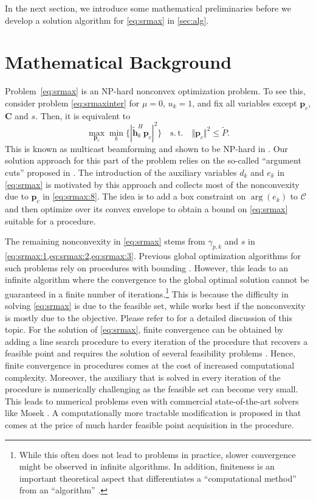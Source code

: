 \documentclass[a4paper,10pt,journal]{IEEEtran}
\newcommand{\st}{\mathrm{s.\,t.}}
\let\vec\bm
\begin{document}
In the next section, we introduce some mathematical preliminaries before we develop a solution algorithm for \cref{eq:srmax} in \cref{sec:alg}.

\section{Mathematical Background} \label{sec:sitfund}
Problem~\cref{eq:srmax} is an NP-hard nonconvex optimization problem. To see this, consider problem \cref{eq:srmaxinter} for $\mu = 0$, $u_k = 1$, and fix all variables except $\vec p_c$, $\vec C$ and $s$. Then, it is equivalent to
\begin{equation}
	\max_{\vec p_c} \min_k \{ | \tilde{\vec h}_k^H \vec p_c |^2 \} \quad\st\quad \Vert \vec p_c \Vert^2 \le \tilde P.
\end{equation}
This is known as multicast beamforming and shown to be NP-hard in \cite{Sidiropoulos2006}. Our solution approach for this part of the problem relies on the so-called ``argument cuts'' proposed in \cite{Lu2017}. The introduction of the auxiliary variables $d_k$ and $e_k$ in \cref{eq:srmax} is motivated by this approach and collects most of the nonconvexity due to $\vec p_c$ in \cref{eq:srmax:8}. The idea is to add a box constraint on $\arg(e_k)$ to $\mathcal C$ and then optimize over its convex envelope to obtain a bound on \cref{eq:srmax} suitable for a  procedure.

The remaining nonconvexity in \cref{eq:srmax} stems from $\gamma_{p,k}$ and $s$ in \cref{eq:srmax:1,eq:srmax:2,eq:srmax:3}.  Previous global optimization algorithms for such problems rely on  procedures with  bounding \cite{Bjornson2013,Tervo2015,Liu2017,Chen2018}. However, this leads to an infinite algorithm where the convergence to the global optimal solution cannot be guaranteed in a finite number of iterations.\footnote{While this often does not lead to problems in practice, slower convergence might be observed in infinite algorithms. In addition, finiteness is an important theoretical aspect that differentiates a ``computational method'' from an ``algorithm'' \cite{Knuth1997vol1}.}
This is because the difficulty in solving \cref{eq:srmax} is due to the feasible set, while  works best if the nonconvexity is mostly due to the objective. Please refer to \cite{mmp,sit,diss} for a detailed discussion of this topic. For the solution of \cref{eq:srmax}, finite convergence can be obtained by adding a line search procedure to every iteration of the  procedure that recovers a feasible point and requires the solution of several  feasibility problems \cite[Alg.~3]{Bjornson2013}. Hence, finite convergence in  procedures comes at the cost of increased computational complexity.
%
Moreover, the auxiliary  that is solved in every iteration of the  procedure is numerically challenging as the feasible set can become very small. This leads to numerical problems even with commercial state-of-the-art solvers like Mosek \cite{mosek}. A computationally more tractable modification is proposed in \cite[\S 2.2.2]{Bjornson2013} that comes at the price of much harder feasible point acquisition in the  procedure.
\end{document}
